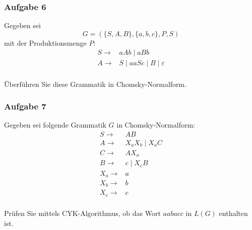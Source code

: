 \documentclass[a4paper,14pt,ngerman]{scrartcl}
\begin{document}
\subsubsection{\textbf{Aufgabe 6}}
\label{sec:orgc859e56}

Gegeben sei \[G=(\{S,A,B\},\{a,b,c\},P,S)\] mit der Produktionsmenge
\(P\): \\

\[\begin{aligned}
        S \rightarrow & aAb \mid aBb\\
        A \rightarrow & S \mid aaSc \mid B \mid \varepsilon\\
\end{aligned}\]

Überführen Sie diese Grammatik in Chomsky-Normalform.
\subsubsection{\textbf{Aufgabe 7}}
\label{sec:org2de759d}

Gegeben sei folgende Grammatik \(G\) in Chomsky-Normalform: \\

\[\begin{aligned}
        S \rightarrow & AB\\
        A \rightarrow & X_aX_b \mid X_aC\\
        C \rightarrow & AX_a\\
        B \rightarrow & c \mid X_cB\\
        X_a \rightarrow & a\\
        X_b \rightarrow & b\\
        X_c \rightarrow & c\\
\end{aligned}\]

Prüfen Sie mittels CYK-Algorithmus, ob das Wort \(aabacc\) in \(L(G)\) enthalten ist.
\end{document}
